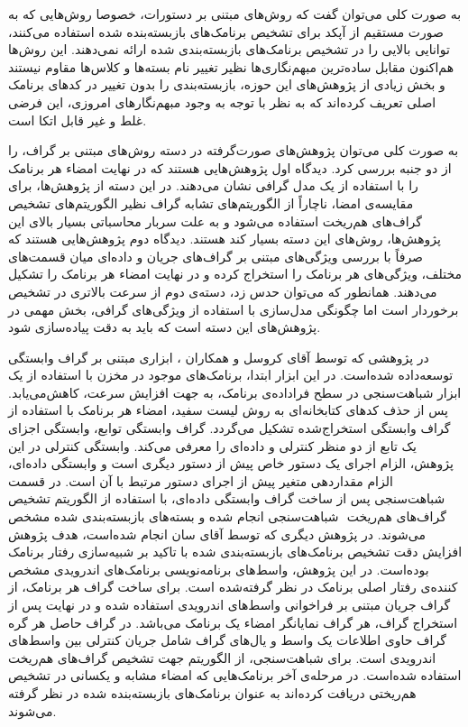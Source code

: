 به صورت کلی می‌توان گفت که روش‌های مبتنی بر دستورات، خصوصا روش‌هایی که به صورت مستقیم از آپکد برای تشخیص برنامک‌های بازبسته‌بنده شده استفاده می‌کنند، توانایی بالایی را در تشخیص برنامک‌های بازبسته‌بندی شده ارائه‌ نمی‌دهند. این روش‌ها هم‌اکنون مقابل ساده‌ترین مبهم‌نگاری‌ها نظیر تغییر نام بسته‌ها و کلاس‌ها مقاوم نیستند و بخش زیادی از پژوهش‌های این حوزه، بازبسته‌بندی را بدون تغییر در کد‌های برنامک اصلی تعریف کرده‌اند که به نظر با توجه به وجود مبهم‌نگارهای امروزی، این فرضی غلط و غیر قابل اتکا است.

به صورت کلی می‌توان پژوهش‌های صورت‌گرفته در دسته‌ روش‌های مبتنی بر گراف، را از دو جنبه بررسی کرد. دیدگاه اول پژوهش‌هایی هستند که در نهایت امضاء هر برنامک را با استفاده از یک مدل گرافی نشان می‌دهند. در این دسته از پژوهش‌ها، برای مقایسه‌ی امضا، ناچاراً از الگوریتم‌های تشابه گراف نظیر الگوریتم‌های تشخیص گراف‌های هم‌ریخت استفاده می‌شود و به علت سربار محاسباتی بسیار بالای این پژوهش‌ها، روش‌های این دسته بسیار کند هستند. دیدگاه دوم پژوهش‌هایی هستند که صرفاً با بررسی ویژگی‌های مبتنی بر گراف‌های جریان و داده‌ای میان قسمت‌‌های مختلف، ویژگی‌های هر برنامک را استخراج کرده و در نهایت امضاء هر برنامک را تشکیل می‌دهند. همانطور که می‌توان حدس زد، دسته‌ی دوم از سرعت بالاتری در تشخیص برخوردار است اما چگونگی مدل‌سازی با استفاده از ویژگی‌های گرافی، بخش مهمی در پژوهش‌های این دسته است که باید به دقت پیاده‌سازی شود.

در پژوهشی که توسط آقای کروسل و همکاران ، ابزاری مبتنی بر گراف وابستگی توسعه‌داده‌ شده‌است. در این ابزار ابتدا، برنامک‌های موجود در مخزن با استفاده از یک ابزار شباهت‌سنجی در سطح فراداده‌‌ی برنامک، به جهت افزایش سرعت، کاهش‌می‌یابد. پس از حذف کد‌های کتابخانه‌ای به روش لیست سفید، امضاء هر برنامک با استفاده از گراف وابستگی استخراج‌شده تشکیل می‌گردد. گراف وابستگی توابع، وابستگی اجزای یک تابع از دو منظر کنترلی و داده‌ای را معرفی می‌کند. وابستگی کنترلی‌ در این پژوهش، الزام اجرای یک دستور خاص پیش از دستور دیگری است و وابستگی داده‌ای‌، الزام مقداردهی متغیر پیش از اجرای دستور مرتبط با آن است. در قسمت شباهت‌سنجی پس از ساخت گراف وابستگی داده‌ای، با استفاده از الگوریتم تشخیص گراف‌های هم‌ریخت ‌ شباهت‌سنجی انجام شده و بسته‌های بازبسته‌بندی شده مشخص می‌شوند. در پژوهش دیگری که توسط آقای سان انجام‌ شده‌است، هدف پژوهش افزایش دقت تشخیص برنامک‌های بازبسته‌بندی شده با تاکید بر شبیه‌سازی رفتار برنامک بوده‌است. در این پژوهش، واسط‌های برنامه‌نویسی برنامک‌های اندرویدی مشخص کننده‌ی رفتار اصلی برنامک در نظر گرفته‌شده است. برای ساخت گراف هر برنامک، از گراف جریان مبتنی بر فراخوانی واسط‌های اندرویدی استفاده شده و در نهایت پس از استخراج گراف، هر گراف نمایانگر امضاء یک برنامک می‌باشد. در گراف حاصل هر گره گراف حاوی اطلاعات یک واسط و یال‌های گراف شامل جریان کنترلی بین واسط‌های اندرویدی است. برای شباهت‌سنجی، از الگوریتم  جهت تشخیص گراف‌های هم‌ریخت استفاده شده‌است. در مرحله‌ی آخر برنامک‌هایی که امضا‌ء مشابه و یکسانی در تشخیص هم‌ریختی دریافت کرده‌اند به عنوان برنامک‌های بازبسته‌بنده شده در نظر گرفته می‌شوند.

